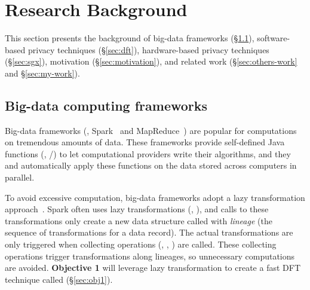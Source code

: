 \vspace{-.15in}\section{Research Background} 
\label{sec:background}\vspace{-.075in}


This section presents the background of big-data 
frameworks (\S\ref{sec:bigdata}), software-based privacy techniques  
(\S\ref{sec:dft}), hardware-based privacy techniques (\S\ref{sec:sgx}), 
motivation (\S\ref{sec:motivation}), and related work 
(\S\ref{sec:others-work} and \S\ref{sec:my-work}).


\vspace{-.15in}\subsection{Big-data computing frameworks} 
\label{sec:bigdata}\vspace{-.075in}

Big-data frameworks (\eg, Spark~\cite{nsdi12:spark} and 
MapReduce~\cite{mapreduce}) are popular for computations on tremendous amounts 
of data. These frameworks provide self-defined Java functions (\eg, 
/) to let computational providers write their algorithms, 
and they and automatically apply these functions on the data stored across 
computers in parallel.



To avoid excessive computation, big-data frameworks adopt a lazy 
transformation approach~\cite{pig:vldb08,nsdi12:spark,osdi08:dryad}. Spark 
often uses lazy transformations (\eg, ), and calls to 
these transformations only create a new data structure called  with 
\emph{lineage} (the sequence of transformations for a data record).
The actual transformations are only triggered when collecting 
operations (\eg, , ) are called. These collecting 
operations trigger transformations along lineages, so unnecessary 
computations are avoided. \textbf{Objective 1} will leverage lazy 
transformation to create a fast DFT technique called \lazyp (\S\ref{sec:obj1}).

